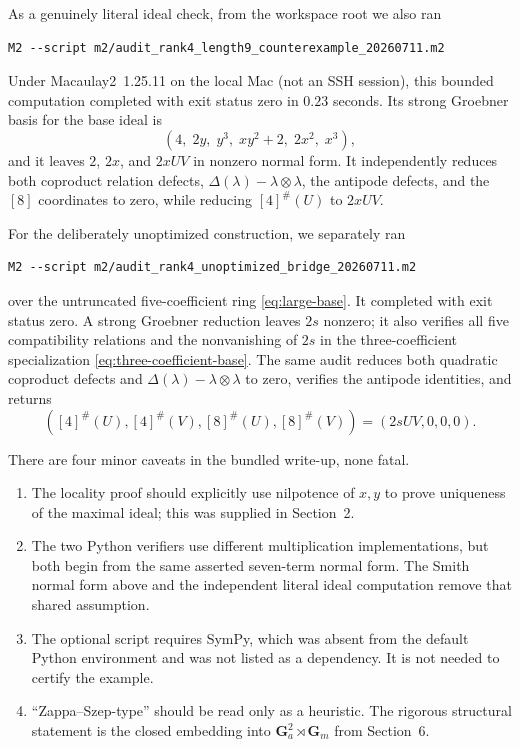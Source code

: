 \documentclass[11pt]{article}
\theoremstyle{remark}
\newcommand{\Gm}{\mathbf G_m}
\newcommand{\Ga}{\mathbf G_a}
\newcommand{\ot}{\otimes}
\begin{document}
As a genuinely literal ideal check, from the workspace root we also ran
\begin{verbatim}
M2 --script m2/audit_rank4_length9_counterexample_20260711.m2
\end{verbatim}
Under Macaulay2~1.25.11 on the local Mac (not an SSH session), this bounded
computation completed with exit status zero in $0.23$ seconds.  Its
strong Groebner basis for the base ideal is
\[
 (4,\;2y,\;y^3,\;xy^2+2,\;2x^2,\;x^3),
\]
and it leaves $2$, $2x$, and $2xUV$ in nonzero normal form.  It independently
reduces both coproduct relation defects,
$\Delta(\lambda)-\lambda\ot\lambda$, the antipode defects, and the
$[8]$ coordinates to zero, while reducing $[4]^\#(U)$ to $2xUV$.

For the deliberately unoptimized construction, we separately ran
\begin{verbatim}
M2 --script m2/audit_rank4_unoptimized_bridge_20260711.m2
\end{verbatim}
over the untruncated five-coefficient ring
\eqref{eq:large-base}.  It completed with exit status zero.  A strong
Groebner reduction leaves $2s$ nonzero; it also verifies all five
compatibility relations and the nonvanishing of $2s$ in the
three-coefficient specialization \eqref{eq:three-coefficient-base}.
The same audit reduces both quadratic coproduct
defects and $\Delta(\lambda)-\lambda\ot\lambda$ to zero, verifies the
antipode identities, and returns
\[
 ([4]^\#(U),[4]^\#(V),[8]^\#(U),[8]^\#(V))
 =(2sUV,0,0,0).
\]

There are four minor caveats in the bundled write-up, none fatal.
\begin{enumerate}
\item The locality proof should explicitly use nilpotence of $x,y$ to prove
uniqueness of the maximal ideal; this was supplied in Section~2.
\item The two Python verifiers use different multiplication implementations,
but both begin from the same asserted seven-term normal form.  The Smith
normal form above and the independent literal ideal computation remove that
shared assumption.
\item The optional script
 requires SymPy, which was absent
from the default Python environment and was not listed as a dependency.  It
is not needed to certify the example.
\item ``Zappa--Szep-type'' should be read only as a heuristic.  The rigorous
structural statement is the closed embedding into
$\Ga^2\rtimes\Gm$ from Section~6.
\end{enumerate}
\end{document}
